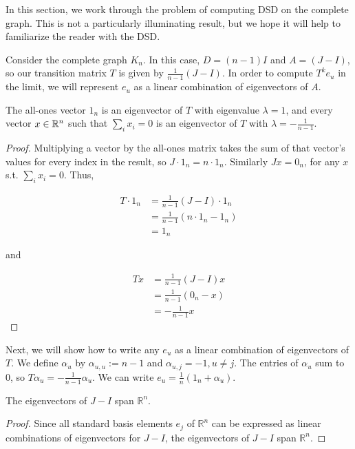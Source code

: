 In this section, we work through the problem of computing DSD on the complete graph. This is not a
particularly illuminating result, but we hope it will help to familiarize the reader with the DSD.

Consider the complete graph $K_n$. In this case, $D = (n-1)I$ and $A = (J - I)$, so our transition
matrix $T$ is given by $\frac{1}{n-1}(J-I)$. In order to compute $T^ke_u$ in the limit, we will
represent $e_u$ as a linear combination of eigenvectors of $A$.

\begin{proposition}
  The all-ones vector $1_n$ is an eigenvector of $T$ with eigenvalue $\lambda = 1$, and every
  vector $x \in \mathbb{R}^n$ such that $\sum_i x_i = 0$ is an eigenvector of $T$ with
  $\lambda = -\frac{1}{n-1}$.
\end{proposition}
\begin{proof}
  Multiplying a vector by the all-ones matrix takes the sum of that vector's
  values for every index in the result, so $J \cdot 1_n = n \cdot 1_n$.
  Similarly $Jx = 0_n$, for any $x$ s.t. $\sum_i x_i = 0$. Thus,

  \begin{align*}
    T\cdot 1_n &= \frac{1}{n-1}(J-I) \cdot 1_n \\
               &= \frac{1}{n-1}(n\cdot 1_n - 1_n) \\
               &= 1_n
  \end{align*}

  and

  \begin{align*}
    Tx &= \frac{1}{n-1}(J-I)x \\
       &= \frac{1}{n-1}(0_n - x) \\
       &= -\frac{1}{n-1}x
  \end{align*}
\end{proof}


Next, we will show how to write any $e_u$ as a linear combination of
eigenvectors of $T$. We define $\alpha_u$ by $\alpha_{u,u} := n-1$ and
$\alpha_{u,j} = -1, u\neq j$. The entries of $\alpha_u$ sum to $0$, so
$T\alpha_u=-\frac{1}{n-1}\alpha_u$. We can write
$e_u = \frac{1}{n}(1_n + \alpha_u)$.

\begin{corollary}
  The eigenvectors of $J-I$ span $\mathbb{R}^n$.
\end{corollary}
\begin{proof}
  Since all standard basis elements $e_j$ of $\mathbb{R}^n$ can be expressed as linear
  combinations of eigenvectors for $J-I$, the eigenvectors of $J-I$ span $\mathbb{R}^n$.
\end{proof}

